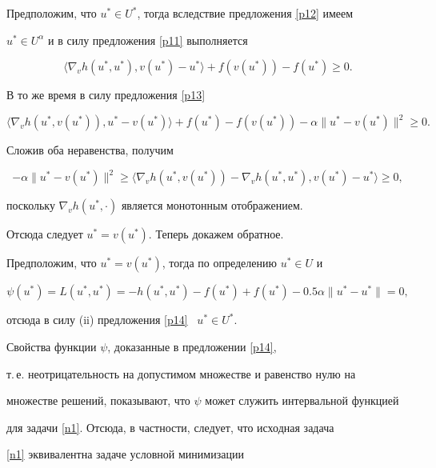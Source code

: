 \begin{pf}


Предположим, что $u^* \in U^*$, тогда вследствие предложения \ref{p12} имеем 


$u^* \in U^\alpha$ и в силу предложения \ref{p11} выполняется


$$


\langle \nabla_v h(u^*,u^*), v(u^*) - u^*\rangle  + f(v(u^*)) - f(u^*) \ge 0.


$$


В то же время в силу предложения \ref{p13}


$$


\langle \nabla_v h(u^*,v(u^*)), u^* - v(u^*)\rangle  + f(u^*) - f(v(u^*)) - 


\alpha\|u^* - v(u^*)\|^2 \ge 0.


$$


Сложив оба неравенства, получим


$$


-\alpha\|u^* - v(u^*)\|^2 \ge \langle \nabla_v h(u^*,v(u^*)) -


\nabla_v h(u^*,u^*), v(u^*) - u^*\rangle  \ge 0,


$$


поскольку $\nabla_v h(u^*,\cdot)$ является монотонным отображением. 


Отсюда следует $u^* = v(u^*)$. Теперь докажем обратное. 


Предположим, что $u^* = v(u^*)$, тогда по определению $u^* \in U$ и


$$


\psi(u^*) = L(u^*, u^*) = 


- h(u^*,u^*) - f(u^*) + f(u^*) - 0.5\alpha\|u^* - u^*\| = 0,


$$


отсюда в силу (ii) предложения \ref{p14} \ $u^* \in U^*$. 


\end{pf}





Свойства функции $\psi$, доказанные в предложении \ref{p14}, 


т.\,е. неотрицательность на допустимом множестве и равенство нулю на 


множестве решений, показывают, что $\psi$ может служить интервальной функцией 


для задачи \ref{n1}. Отсюда, в частности, следует, что исходная задача 


\ref{n1} эквивалентна задаче условной минимизации 


